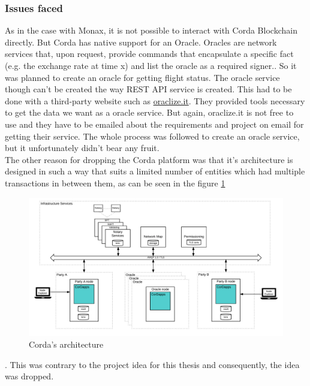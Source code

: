 \subsubsection{Issues faced}
As in the case with Monax, it is not possible to interact with Corda Blockchain directly. But Corda has native support for an Oracle. Oracles are network services that, upon request, provide commands that encapsulate a specific fact (e.g. the exchange rate at time x) and list the oracle as a required signer.\cite{OraclesDocumentation}. So it was planned to create an oracle for getting flight status. The oracle service though can't be created the way REST API service is created. This had to be done with a third-party website such as \url{oraclize.it}. They provided tools necessary to get the data we want as a oracle service. But again, oraclize.it is not free to use and they have to be emailed about the requirements and project on email for getting their service. The whole process was followed to create an oracle service, but it unfortunately didn't bear any fruit.
\\The other reason for dropping the Corda platform was that it's architecture is designed in such a way that suits a limited number of entities which had multiple transactions in between them, as can be seen in the figure \ref{fig:corda_architecture}
\begin{figure}
    \centering
    \includegraphics[width=\textwidth]{Figures/corda_architecture.png}
    \caption{Corda's architecture}
    \label{fig:corda_architecture}
\end{figure}.
This was contrary to the project idea for this thesis and consequently, the idea was dropped.


